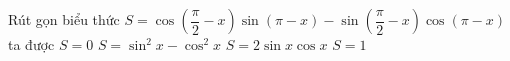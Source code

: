 \begin{ex}%
	Rút gọn biểu thức $S=\cos \left(\dfrac{\pi}{2}-x\right)\sin \left(\pi-x\right)-\sin \left(\dfrac{\pi}{2}-x\right)\cos \left(\pi-x\right)$ ta  được
	\choice 
		 {$S=0$}
		{$S=\sin  ^2x-\cos ^2x$}
		{$S=2\sin  x\cos x$}
		{\True  $S=1$}
\end{ex}
